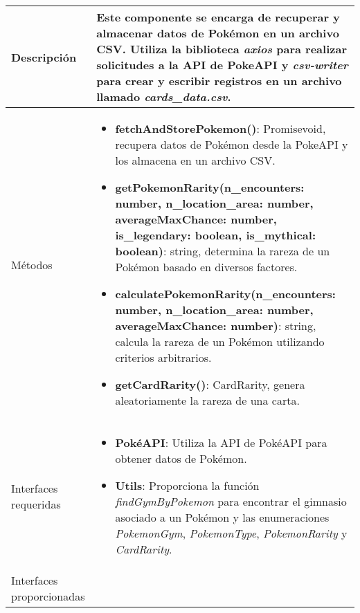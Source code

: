 \begin{longtable}{
    >{\columncolor{lightgreen!20}}p{4cm}
    p{12cm}
    }
    \midrule
    Descripción & Este componente se encarga de recuperar y almacenar datos de Pokémon en un archivo CSV. Utiliza la biblioteca \textit{axios} para realizar solicitudes a la API de PokeAPI y \textit{csv-writer} para crear y escribir registros en un archivo llamado \textit{cards_data.csv}.
    \\
    \midrule
    Métodos &
    \begin{itemize}[nosep,leftmargin=*]
      \item \textbf{fetchAndStorePokemon()}: Promise\<void\>, recupera datos de Pokémon desde la PokeAPI y los almacena en un archivo CSV.
      \item \textbf{getPokemonRarity(n_encounters: number, n_location_area: number, averageMaxChance: number, is_legendary: boolean, is_mythical: boolean)}: string, determina la rareza de un Pokémon basado en diversos factores.
      \item \textbf{calculatePokemonRarity(n_encounters: number, n_location_area: number, averageMaxChance: number)}: string, calcula la rareza de un Pokémon utilizando criterios arbitrarios.
      \item \textbf{getCardRarity()}: CardRarity, genera aleatoriamente la rareza de una carta.
    \end{itemize} \\
    \midrule
    Interfaces requeridas & \begin{itemize}[nosep,leftmargin=*]
      \item \textbf{PokéAPI}: Utiliza la API de PokéAPI para obtener datos de Pokémon.
      \item \textbf{Utils}: Proporciona la función \textit{findGymByPokemon} para encontrar el gimnasio asociado a un Pokémon y las enumeraciones \textit{PokemonGym}, \textit{PokemonType}, \textit{PokemonRarity} y \textit{CardRarity}.
    \end{itemize} \\
    \midrule
    Interfaces proporcionadas & \\
    \end{longtable}

